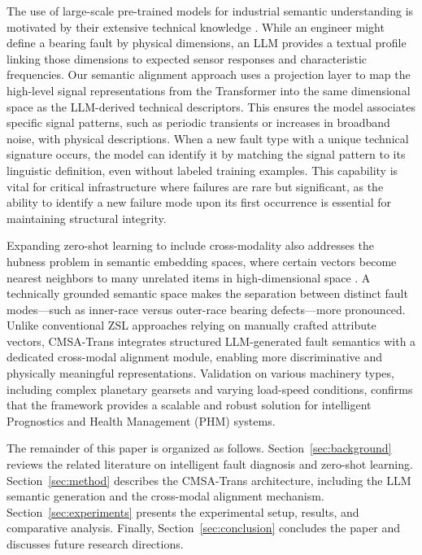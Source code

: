 \documentclass[journal]{IEEEtran}
\begin{document}
The use of large-scale pre-trained models for industrial semantic understanding is motivated by their extensive technical knowledge \cite{zhao2023brain}. While an engineer might define a bearing fault by physical dimensions, an LLM provides a textual profile linking those dimensions to expected sensor responses and characteristic frequencies. Our semantic alignment approach uses a projection layer to map the high-level signal representations from the Transformer into the same dimensional space as the LLM-derived technical descriptors. This ensures the model associates specific signal patterns, such as periodic transients or increases in broadband noise, with physical descriptions. When a new fault type with a unique technical signature occurs, the model can identify it by matching the signal pattern to its linguistic definition, even without labeled training examples. This capability is vital for critical infrastructure where failures are rare but significant, as the ability to identify a new failure mode upon its first occurrence is essential for maintaining structural integrity.

Expanding zero-shot learning to include cross-modality also addresses the hubness problem in semantic embedding spaces, where certain vectors become nearest neighbors to many unrelated items in high-dimensional space \cite{radovanovic2010hubs}. A technically grounded semantic space makes the separation between distinct fault modes---such as inner-race versus outer-race bearing defects---more pronounced. Unlike conventional ZSL approaches relying on manually crafted attribute vectors, CMSA-Trans integrates structured LLM-generated fault semantics with a dedicated cross-modal alignment module, enabling more discriminative and physically meaningful representations. Validation on various machinery types, including complex planetary gearsets and varying load-speed conditions, confirms that the framework provides a scalable and robust solution for intelligent Prognostics and Health Management (PHM) systems.

The remainder of this paper is organized as follows. Section~\ref{sec:background} reviews the related literature on intelligent fault diagnosis and zero-shot learning. Section~\ref{sec:method} describes the CMSA-Trans architecture, including the LLM semantic generation and the cross-modal alignment mechanism. Section~\ref{sec:experiments} presents the experimental setup, results, and comparative analysis. Finally, Section~\ref{sec:conclusion} concludes the paper and discusses future research directions.
\end{document}
